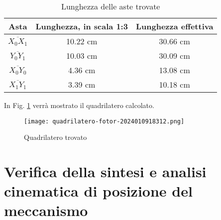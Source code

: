 \documentclass{article}
\begin{document}
\begin{table} [h!]
    \centering
    \begin{tabular}{c|c|c}
    \hline
        Asta & Lunghezza, in scala 1:3 & Lunghezza effettiva \\
    \hline
         $\overline{X_0X_1}$ & 10.22 cm & 30.66 cm\\
    \hline
         $\overline{Y_0Y_1}$ & 10.03 cm & 30.09 cm\\
    \hline
         $\overline{X_0Y_0}$ & 4.36 cm & 13.08 cm\\
    \hline
         $\overline{X_1Y_1}$ & 3.39 cm & 10.18 cm\\
    \end{tabular}
    \caption{Lunghezza delle aste trovate}
    \label{tab:my_label3}
\end{table}

In Fig. \ref{quadrl} verrà mostrato il quadrilatero calcolato.

\begin{figure}[h!]
    \centering
    \texttt{[image: quadrilatero-fotor-2024010918312.png]}
    \caption{Quadrilatero trovato}
    \label{quadrl}
\end{figure}

\newpage
\section{Verifica della sintesi e analisi cinematica di posizione del meccanismo}
\end{document}
